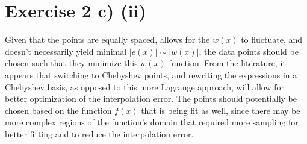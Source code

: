 \documentclass[12pt]{article}{}
\begin{document}
\section*{Exercise 2 c) (ii)}
Given that the points are equally spaced, allows for the $w(x)$ to fluctuate, and doesn't necessarily yield minimal $|e(x)| \sim |w(x)|$, the data points should be chosen such that they minimize this $w(x)$ function. From the literature, it appears that switching to Chebyshev points, and rewriting the expressions in a Chebyshev basis, as opposed to this more Lagrange approach, will allow for better optimization of the interpolation error. The points should potentially be chosen based on the function $f(x)$ that is being fit as well, since there may be more complex regions of the function's domain that required more sampling for better fitting and to reduce the interpolation error. 
% 
\end{document}
